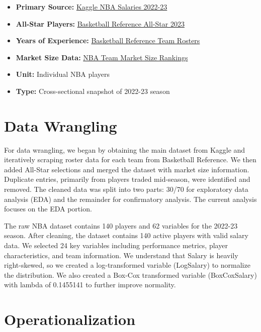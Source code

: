 \documentclass[
  11pt,
]{article}
\providecommand{\tightlist}{%
  \setlength{\itemsep}{0pt}\setlength{\parskip}{0pt}}
\begin{document}
\begin{itemize}
\tightlist
\item
  \textbf{Primary Source:} \href{https://www.kaggle.com/datasets/jamiewelsh2/nba-player-salaries-2022-23-season/data}{Kaggle NBA Salaries 2022-23}
\item
  \textbf{All-Star Players:} \href{https://www.basketball-reference.com/allstar/NBA_2023.html}{Basketball Reference All-Star 2023}
\item
  \textbf{Years of Experience:} \href{https://www.basketball-reference.com/teams/ATL/2023.html}{Basketball Reference Team Rosters}
\item
  \textbf{Market Size Data:} \href{https://hoop-social.com/nba-team-market-size-rankings/}{NBA Team Market Size Rankings}
\item
  \textbf{Unit:} Individual NBA players
\item
  \textbf{Type:} Cross-sectional snapshot of 2022-23 season
\end{itemize}

\hypertarget{data-wrangling}{%
\section{Data Wrangling}\label{data-wrangling}}

For data wrangling, we began by obtaining the main dataset from Kaggle and iteratively scraping roster data for each team from Basketball Reference. We then added All-Star selections and merged the dataset with market size information. Duplicate entries, primarily from players traded mid-season, were identified and removed. The cleaned data was split into two parts: 30/70 for exploratory data analysis (EDA) and the remainder for confirmatory analysis. The current analysis focuses on the EDA portion.

The raw NBA dataset contains 140 players and 62 variables for the 2022-23 season. After cleaning, the dataset contains 140 active players with valid salary data. We selected 24 key variables including performance metrics, player characteristics, and team information. We understand that Salary is heavily right-skewed, so we created a log-transformed variable (LogSalary) to normalize the distribution. We also created a Box-Cox transformed variable (BoxCoxSalary) with lambda of 0.1455141 to further improve normality.

\hypertarget{operationalization}{%
\section{Operationalization}\label{operationalization}}
\end{document}

